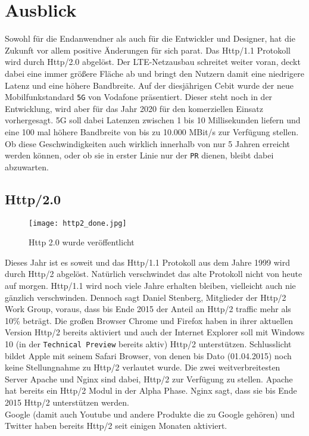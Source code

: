 \section{Ausblick} %
\label{sec:ausblick}
	Sowohl für die Endanwendner als auch für die Entwickler und Designer, hat die Zukunft vor allem positive Änderungen für sich parat. Das Http/1.1 Protokoll wird durch Http/2.0 abgelöst. Der LTE-Netzausbau schreitet weiter voran, deckt dabei eine immer größere Fläche ab und bringt den Nutzern damit eine niedrigere Latenz und eine höhere Bandbreite. Auf der diesjährigen Cebit wurde der neue Mobilfunkstandard \texttt{5G} von Vodafone präsentiert. Dieser steht noch in der Entwicklung, wird aber für das Jahr 2020 für den komerziellen Einsatz vorhergesagt. 5G soll dabei Latenzen zwischen 1 bis 10 Millisekunden liefern und eine 100 mal höhere Bandbreite von bis zu 10.000 MBit/s zur Verfügung stellen.\autocite{lte-anbieter15} Ob diese Geschwindigkeiten auch wirklich innerhalb von nur 5 Jahren erreicht werden können, oder ob sie in erster Linie nur der \texttt{PR} dienen, bleibt dabei abzuwarten.

	\subsection{Http/2.0} %
	\label{sub:http_2_0}
		\begin{figure}[htbp]
			\begin{center}
				\texttt{[image: http2\_done.jpg]}
				\caption{Http 2.0 wurde veröffentlicht}
				\label{fig:http2_done}
			\end{center}
		\end{figure}

		Dieses Jahr ist es soweit und das Http/1.1 Protokoll aus dem Jahre 1999 wird durch Http/2 abgelöst. Natürlich verschwindet das alte Protokoll nicht von heute auf morgen. Http/1.1 wird noch viele Jahre erhalten bleiben, vielleicht auch nie gänzlich verschwinden. Dennoch sagt Daniel Stenberg, Mitglieder der Http/2 Work Group, voraus, dass bis Ende 2015 der Anteil an Http/2 traffic mehr als 10\% beträgt.\autocite{stenberg15} Die großen Browser Chrome und Firefox haben in ihrer aktuellen Version Http/2 bereits aktiviert und auch der Internet Explorer soll mit Windows 10 (in der \texttt{Technical Preview} bereits aktiv) Http/2 unterstützen.\autocite{microsoft14} Schlusslicht bildet Apple mit seinem Safari Browser, von denen bis Dato (01.04.2015) noch keine Stellungnahme zu Http/2 verlautet wurde.
		Die zwei weitverbreitesten Server Apache und Nginx sind dabei, Http/2 zur Verfügung zu stellen. Apache hat bereits ein Http/2 Modul in der Alpha Phase. Nginx sagt, dass sie bis Ende 2015 Http/2 unterstützen werden.\\
		Google (damit auch Youtube und andere Produkte die zu Google gehören) und Twitter haben bereits Http/2 seit einigen Monaten aktiviert.

